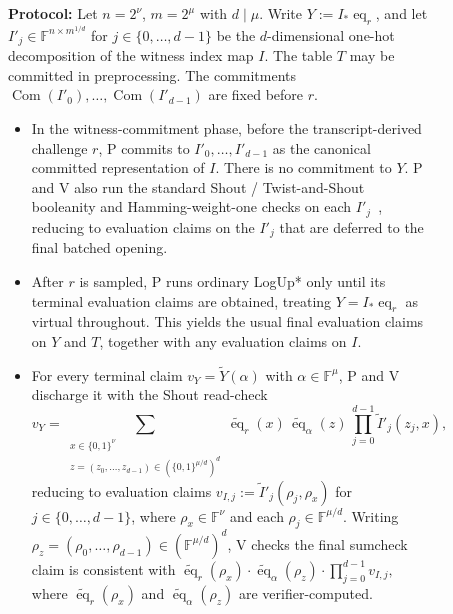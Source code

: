 \begin{figure}[!htbp]
\setlength{\FrameSep}{4pt}
\begin{framed}

\noindent\textbf{Protocol:}
Let $n=2^\nu$, $m=2^\mu$ with $d\mid\mu$.
Write $Y:=I_*\operatorname{eq}_r$, and let $I'_j\in\mathbb{F}^{n\times m^{1/d}}$ for $j\in\{0,\ldots,d-1\}$
be the $d$-dimensional one-hot decomposition of the witness index map $I$.
The table $T$ may be committed in preprocessing.
The commitments $\operatorname{Com}(I'_0),\ldots,\operatorname{Com}(I'_{d-1})$ are fixed before $r$.

\begin{itemize}
\item
In the witness-commitment phase, before the transcript-derived challenge $r$,
P commits to $I'_0,\ldots,I'_{d-1}$ as the canonical committed representation of $I$.
There is no commitment to $Y$.
P and V also run the standard Shout / Twist-and-Shout booleanity and Hamming-weight-one checks
on each $I'_j$~\cite[Figure~8]{cryptoeprint:2025/105}, reducing to evaluation claims on the $I'_j$
that are deferred to the final batched opening.

\item
After $r$ is sampled, P runs ordinary LogUp* only until its terminal evaluation claims are obtained,
treating $Y=I_*\operatorname{eq}_r$ as virtual throughout.
This yields the usual final evaluation claims on $Y$ and $T$, together with any evaluation
claims on $I$.

\item
For every terminal claim $v_Y=\widetilde{Y}(\alpha)$ with $\alpha\in\mathbb{F}^\mu$,
P and V discharge it with the Shout read-check
\[
v_Y
=
\sum_{\substack{
    x \in \{0,1\}^{\nu} \\
    z=(z_0,\ldots,z_{d-1})\in(\{0,1\}^{\mu/d})^{d}
    }}
\widetilde{\operatorname{eq}}_r(x)\,
\widetilde{\operatorname{eq}}_{\alpha}(z)\,
\prod_{j=0}^{d-1}\widetilde{I}'_j(z_j,x),
\]
reducing to evaluation claims
$v_{I,j}:=\widetilde{I}'_j(\rho_j,\rho_x)$
for $j\in\{0,\ldots,d-1\}$,
where $\rho_x\in\mathbb{F}^{\nu}$ and each $\rho_j\in\mathbb{F}^{\mu/d}$.
Writing $\rho_z=(\rho_0,\ldots,\rho_{d-1})\in(\mathbb{F}^{\mu/d})^{d}$,
V checks the final sumcheck claim is consistent with
\(
\widetilde{\operatorname{eq}}_r(\rho_x)\cdot
\widetilde{\operatorname{eq}}_{\alpha}(\rho_z)\cdot
\prod_{j=0}^{d-1}v_{I,j},
\)
where $\widetilde{\operatorname{eq}}_r(\rho_x)$ and $\widetilde{\operatorname{eq}}_{\alpha}(\rho_z)$ are verifier-computed.


\end{itemize}
\end{framed}
\end{figure}
